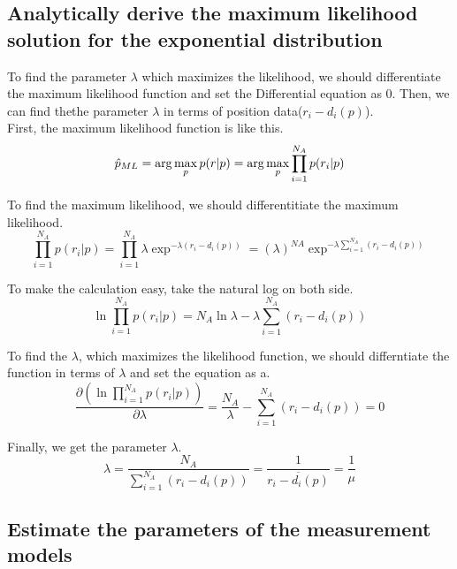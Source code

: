 \documentclass[a4paper]{article}
\begin{document}
\subsection{Analytically derive the maximum likelihood solution for the exponential distribution}

\newcommand{\prip}{p(r_i|p)}
\newcommand{\ridi}{r_i-d_i(p)}
\newcommand{\signa}{\sum\limits_{i=1}^{N_A}}
\newcommand{\mulna}{\prod\limits_{i = 1}^{N_A}}

To find the parameter $\lambda$ which maximizes the likelihood, we should differentiate the maximum likelihood function and set the Differential equation as 0. Then, we can find thethe parameter $\lambda$ in terms of position data($\ridi$).\\
\noindent
First, the maximum likelihood function is like this.\\
\begin{equation}
\hat{p}_{ML} = \arg\max\limits_{p}p(r|p) = \arg\max\limits_{p}\mulna\prip\\
\end{equation}

\noindent
To find the maximum likelihood, we should differentitiate the maximum likelihood.\\
\begin{equation}
\mulna\prip =\mulna\lambda\exp^{-\lambda(\ridi)} = (\lambda)^{NA}\exp^{-\lambda\signa(\ridi)}
\end{equation}

\noindent
To make the calculation easy, take the natural log on both side.
\begin{equation}
\ln\mulna\prip = N_A \ln\lambda - \lambda\signa(\ridi)
\end{equation}

\noindent
To find the $\lambda$, which maximizes the likelihood function, we should differntiate the function in terms of $\lambda$ and set the equation as a. 
\begin{equation}
\frac{\partial(\ln\mulna\prip)}{\partial \lambda} = \frac{N_A}{\lambda} - \signa(\ridi) =0
\end{equation}

\noindent
Finally, we get the parameter $\lambda$.
\begin{equation}
\lambda = \frac{N_A}{\signa(\ridi)} = \frac{1}{\overline{\ridi}} = \frac{1}{\mu}
\end{equation}
\clearpage

\subsection{Estimate the parameters of the measurement models}
\end{document}
